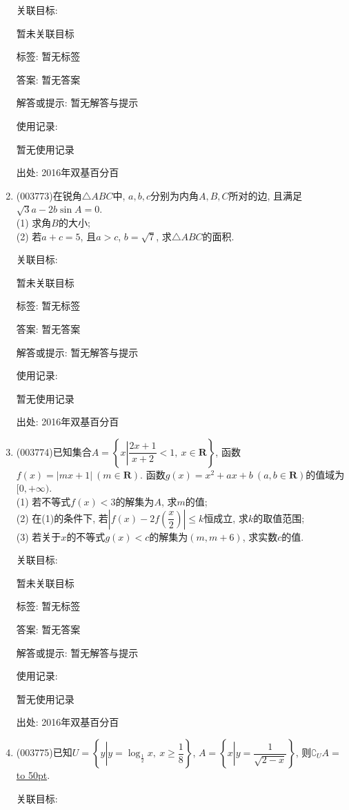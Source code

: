 \documentclass[10pt,a4paper]{article}
\newcommand{\blank}[1]{\underline{\hbox to #1pt{}}}
\begin{document}
\begin{enumerate}[1.]
关联目标:

暂未关联目标



标签: 暂无标签

答案: 暂无答案

解答或提示: 暂无解答与提示

使用记录:

暂无使用记录


出处: 2016年双基百分百
\item { (003773)}在锐角$\triangle ABC$中, $a,b,c$分别为内角$A,B,C$所对的边, 且满足$\sqrt{3}a-2b\sin A=0$.\\
(1) 求角$B$的大小;\\
(2) 若$a+c=5$, 且$a>c$, $b=\sqrt{7}$, 求$\triangle ABC$的面积.


关联目标:

暂未关联目标



标签: 暂无标签

答案: 暂无答案

解答或提示: 暂无解答与提示

使用记录:

暂无使用记录


出处: 2016年双基百分百
\item { (003774)}已知集合$A=\left\{x\left|\dfrac{2x+1}{x+2}<1, \ x\in \mathbf{R}\right.\right\}$, 函数$f(x)=|mx+1| \ (m\in \mathbf{R})$. 函数$g(x)=x^2+ax+b \ (a,b\in \mathbf{R})$的值域为$[0,+\infty)$.\\
(1) 若不等式$f(x)<3$的解集为$A$, 求$m$的值;\\
(2) 在(1)的条件下, 若$\left|f(x)-2f\left(\dfrac x 2\right)\right|\le k$恒成立, 求$k$的取值范围;\\
(3) 若关于$x$的不等式$g(x)<c$的解集为$(m,m+6)$, 求实数$c$的值.


关联目标:

暂未关联目标



标签: 暂无标签

答案: 暂无答案

解答或提示: 暂无解答与提示

使用记录:

暂无使用记录


出处: 2016年双基百分百
\item { (003775)}已知$U=\left\{y\left|y=\log_\frac 12 x, \ x\ge \dfrac 18\right.\right\}$, $A=\left\{x\left|y=\dfrac{1}{\sqrt{2-x}}\right.\right\}$, 则$\complement_U A=$\blank{50}.


关联目标:


\end{enumerate}
\end{document}
